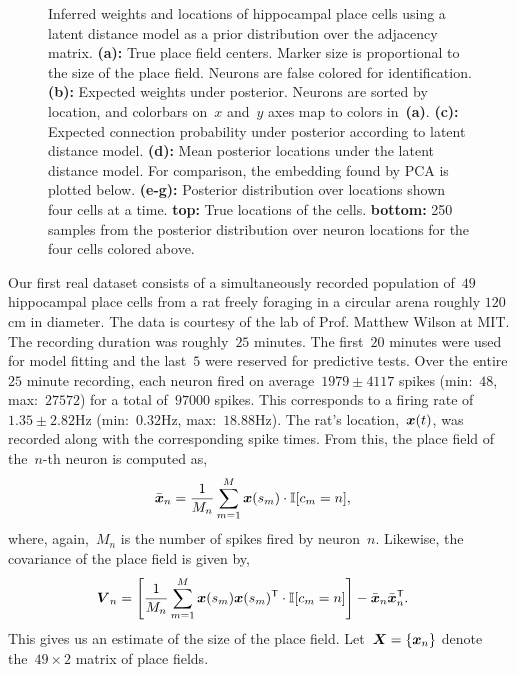 \begin{figure}[t!]
\begin{center}
    \vspace{-3em}
  \end{center}
  \caption[Inferred weights and locations of hippocampal place cells]{ Inferred
    weights and locations of hippocampal place cells using a latent distance model
    as a prior distribution over the adjacency matrix.
    \textbf{(a):} True place field centers. Marker size is proportional to the size of the place field. Neurons are false colored for identification.
    \textbf{(b):} Expected weights under posterior. Neurons are sorted by location, and colorbars on~$x$ and~$y$ axes map to colors in~\textbf{(a)}.
    \textbf{(c):} Expected connection probability under posterior according to latent distance model.
    \textbf{(d):} Mean posterior locations under the latent distance model. For comparison, the embedding found by PCA is plotted below. 
    \textbf{(e-g): } Posterior distribution over locations shown four cells at a time.
    \textbf{top:} True locations of the cells. 
    \textbf{bottom:} 250 samples from the posterior
    distribution over neuron locations for the four cells colored above.
  }
  \label{fig:hawkes_hipp}
\end{figure}

Our first real dataset consists of a simultaneously recorded
population of~$49$ hippocampal place cells from a rat freely foraging
in a circular arena roughly $120$cm in diameter. The data is courtesy
of the lab of Prof. Matthew Wilson at MIT. The recording duration was
roughly~$25$ minutes. The first~$20$ minutes were used for model
fitting and the last~$5$ were reserved for predictive tests. Over the
entire $25$ minute recording, each neuron fired on
average~$1979\pm4117$ spikes (min:~$48$, max:~$27572$) for a total
of~$97000$ spikes. This corresponds to a firing rate of~$1.35 \pm
2.82$Hz (min:~$0.32$Hz, max:~$18.88$Hz). The rat's location,~$\boldsymbol{x}(t)$,
was recorded along with the corresponding spike times. From this, the
place field of the~$n$-th neuron is computed as,
\begin{align*}
  \bar{\boldsymbol{x}}_n &= \frac{1}{M_n} \sum_{m=1}^M \boldsymbol{x}(s_m) \cdot \mathbb{I}[c_m=n],
\end{align*}
where, again,~$M_n$ is the number of spikes fired by neuron~$n$. Likewise,
the covariance of the place field is given by,
\begin{align*}
  \boldsymbol{V}_n &= \left[ \frac{1}{M_n} \sum_{m=1}^M  \boldsymbol{x}(s_m) \boldsymbol{x}(s_m)^{\mathsf{T}}  \cdot \mathbb{I}[c_m = n] \right] - \bar{\boldsymbol{x}}_n \bar{\boldsymbol{x}}_n^{\mathsf{T}}.
\end{align*}
This gives us an estimate of the size of the place field. Let~${\boldsymbol{X}= \{\boldsymbol{x}_n\}}$
denote the~${49\times 2}$ matrix of place fields.

